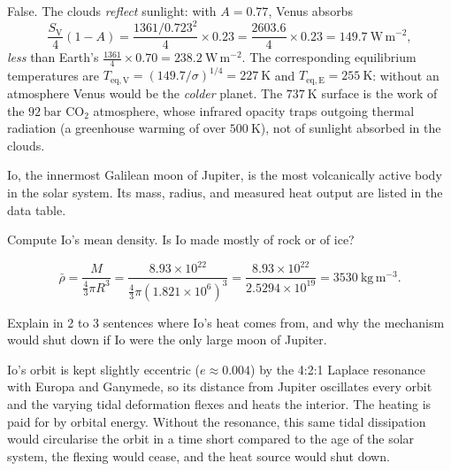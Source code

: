 \begin{solution}
False.
The clouds \emph{reflect} sunlight: with $A = 0.77$, Venus absorbs
\[
  \frac{S_{\mathrm{V}}}{4}(1 - A) = \frac{1361/0.723^2}{4} \times 0.23 = \frac{2603.6}{4} \times 0.23 = 149.7\ \mathrm{W\,m^{-2}},
\]
\emph{less} than Earth's $\frac{1361}{4} \times 0.70 = 238.2\ \mathrm{W\,m^{-2}}$.
The corresponding equilibrium temperatures are $T_{\mathrm{eq,V}} = (149.7/\sigma)^{1/4} = 227\ \mathrm{K}$ and $T_{\mathrm{eq,E}} = 255\ \mathrm{K}$: without an atmosphere Venus would be the \emph{colder} planet.
The $737\ \mathrm{K}$ surface is the work of the $92\ \mathrm{bar}$ $\mathrm{CO_2}$ atmosphere, whose infrared opacity traps outgoing thermal radiation (a greenhouse warming of over $500\ \mathrm{K}$), not of sunlight absorbed in the clouds.
\end{solution}



Io, the innermost Galilean moon of Jupiter, is the most volcanically active body in the solar system.
Its mass, radius, and measured heat output are listed in the data table.

\parti {} Compute Io's mean density. Is Io made mostly of rock or of ice?

\begin{solution}
\[
  \bar{\rho} = \frac{M}{\frac{4}{3}\pi R^3}
             = \frac{8.93 \times 10^{22}}{\frac{4}{3}\pi (1.821 \times 10^{6})^3}
             = \frac{8.93 \times 10^{22}}{2.5294 \times 10^{19}}
             = 3530\ \mathrm{kg\,m^{-3}}.
\]
\end{solution}

\parti {} Explain in 2 to 3 sentences where Io's heat comes from, and why the mechanism would shut down if Io were the only large moon of Jupiter.

\begin{solution}
Io's orbit is kept slightly eccentric ($e \approx 0.004$) by the 4:2:1 Laplace resonance with Europa and Ganymede, so its distance from Jupiter oscillates every orbit and the varying tidal deformation flexes and heats the interior.
The heating is paid for by orbital energy.
Without the resonance, this same tidal dissipation would circularise the orbit in a time short compared to the age of the solar system, the flexing would cease, and the heat source would shut down.
\end{solution}


